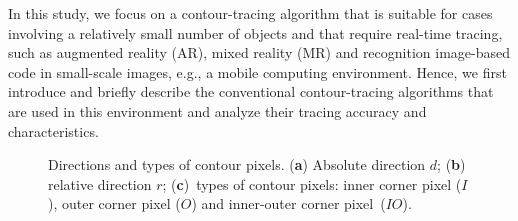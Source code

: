 \documentclass[sensors,article,accept,moreauthors,pdftex,10pt,a4paper]{mdpi}
\begin{document}

In this study, we focus on a contour-tracing algorithm that is suitable for cases involving a relatively small number of objects and that require real-time tracing, such as augmented reality (AR), mixed reality (MR) and recognition image-based code in small-scale images, e.g., a mobile computing environment. Hence, we first introduce and briefly describe the conventional contour-tracing algorithms that are used in this environment and analyze their tracing accuracy and characteristics. 

\begin{figure}[H]
	\centering
	 
	\caption{Directions and types of contour pixels. (\textbf{a}) Absolute direction $d$; (\textbf{b}) relative direction $r$; (\textbf{c})~types of contour pixels: inner corner pixel ($I$), outer corner pixel ($O$) and inner-outer corner pixel~($IO$).}
	\label{fig:image2}
\end{figure}
\end{document}
